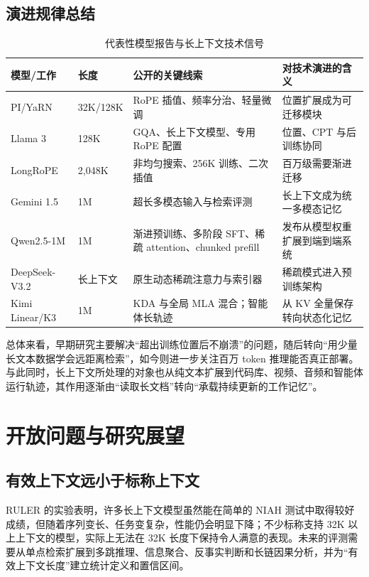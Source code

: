 \documentclass[UTF8,10pt,a4paper,fontset=none]{ctexart}
\begin{document}
\subsection{演进规律总结}
\begin{table}[h]
\centering\small
\caption{代表性模型报告与长上下文技术信号}
\begin{tabularx}{\textwidth}{p{2.4cm}p{1.6cm}X X}
\toprule
模型/工作 & 长度 & 公开的关键线索 & 对技术演进的含义\\
\midrule
PI/YaRN & 32K/128K & RoPE 插值、频率分治、轻量微调 & 位置扩展成为可迁移模块\\
Llama 3 & 128K & GQA、长上下文模型、专用 RoPE 配置 & 位置、CPT 与后训练协同\\
LongRoPE & 2,048K & 非均匀搜索、256K 训练、二次插值 & 百万级需要渐进迁移\\
Gemini 1.5 & 1M & 超长多模态输入与检索评测 & 长上下文成为统一多模态记忆\\
Qwen2.5-1M & 1M & 渐进预训练、多阶段 SFT、稀疏 attention、chunked prefill & 发布从模型权重扩展到端到端系统\\
DeepSeek-V3.2 & 长上下文 & 原生动态稀疏注意力与索引器 & 稀疏模式进入预训练架构\\
Kimi Linear/K3 & 1M & KDA 与全局 MLA 混合；智能体长轨迹 & 从 KV 全量保存转向状态化记忆\\
\bottomrule
\end{tabularx}
\end{table}

总体来看，早期研究主要解决“超出训练位置后不崩溃”的问题，随后转向“用少量长文本数据学会远距离检索”，如今则进一步关注百万 token 推理能否真正部署。与此同时，长上下文所处理的对象也从纯文本扩展到代码库、视频、音频和智能体运行轨迹，其作用逐渐由“读取长文档”转向“承载持续更新的工作记忆”。

\section{开放问题与研究展望}
\subsection{有效上下文远小于标称上下文}
RULER 的实验表明，许多长上下文模型虽然能在简单的 NIAH 测试中取得较好成绩，但随着序列变长、任务变复杂，性能仍会明显下降；不少标称支持 32K 以上上下文的模型，实际上无法在 32K 长度下保持令人满意的表现\cite{hsieh2024ruler}。未来的评测需要从单点检索扩展到多跳推理、信息聚合、反事实判断和长链因果分析，并为“有效上下文长度”建立统计定义和置信区间。
\end{document}
